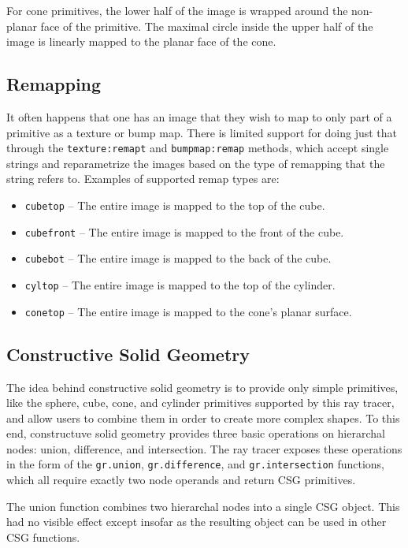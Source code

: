 \documentclass{article}
\begin{document}
For cone primitives, the lower half of the image is wrapped around the
non-planar face of the primitive. The maximal circle inside the upper half of
the image is linearly mapped to the planar face of the cone.

\subsection{Remapping}
\label{remapping}

It often happens that one has an image that they wish to map to only part of a
primitive as a texture or bump map. There is limited support for doing just that
through the {\tt texture:remapt} and {\tt bumpmap:remap} methods, which accept
single strings and reparametrize the images based on the type of remapping that
the string refers to. Examples of supported remap types are:

\newcommand{\cmditem}[1]{\item {\tt #1}}

\begin{itemize}
  \cmditem{cubetop} -- The entire image is mapped to the top of the cube.
  \cmditem{cubefront} -- The entire image is mapped to the front of the cube.
  \cmditem{cubebot} -- The entire image is mapped to the back of the cube.
  \cmditem{cyltop} -- The entire image is mapped to the top of the cylinder.
  \cmditem{conetop} -- The entire image is mapped to the cone's planar surface.
\end{itemize}

\subsection{Constructive Solid Geometry}
\label{csg}

The idea behind constructive solid geometry is to provide only simple
primitives, like the sphere, cube, cone, and cylinder primitives supported by
this ray tracer, and allow users to combine them in order to create more complex
shapes. To this end, constructuve solid geometry provides three basic operations
on hierarchal nodes: union, difference, and intersection. The ray tracer exposes
these operations in the form of the {\tt gr.union}, {\tt gr.difference}, and
{\tt gr.intersection} functions, which all require exactly two node operands and
return CSG primitives.

The union function combines two hierarchal nodes into a single CSG object. This
had no visible effect except insofar as the resulting object can be used in
other CSG functions.
\end{document}

